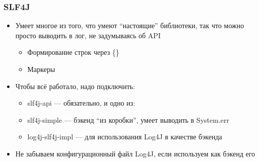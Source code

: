 \documentclass[xetex,mathserif,serif]{beamer}
\begin{document}
	\begin{frame}
		\frametitle{SLF4J}
		\begin{itemize}
			\item Умеет многое из того, что умеют ``настоящие'' библиотеки, так что можно просто выводить в лог, не задумываясь об API
			\begin{itemize}
				\item Формирование строк через \{\}
				\item Маркеры
			\end{itemize}
			\item Чтобы всё работало, надо подключить:
			\begin{itemize}
				\item slf4j-api --- обязательно, и одно из:
				\item slf4j-simple --- бэкенд ``из коробки'', умеет выводить в System.err
				\item log4j-slf4j-impl --- для использования Log4J в качестве бэкенда
			\end{itemize}
			\item Не забываем конфигурационный файл Log4J, если используем как бэкенд его
		\end{itemize}
	\end{frame}
\end{document}
